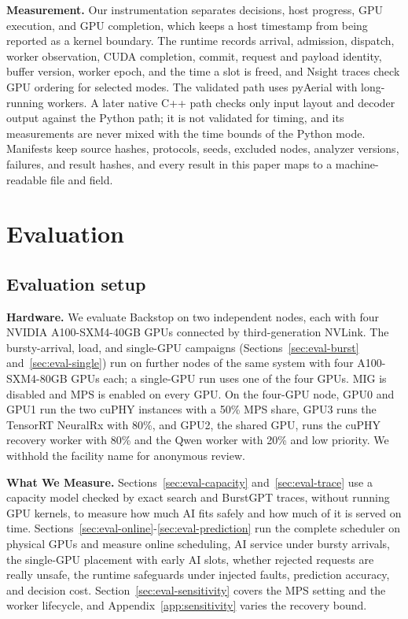 \documentclass[acmsmall,screen,review,anonymous]{acmart}
\newcommand{\sys}{Backstop\xspace}
\newcommand{\NRx}{NeuralRx\xspace}
\begin{document}
\noindent\textbf{Measurement.}
Our instrumentation separates decisions, host progress, GPU execution, and GPU completion, which keeps
a host timestamp from being reported as a kernel boundary. The runtime records arrival, admission,
dispatch, worker observation, CUDA completion, commit, request and payload identity, buffer version,
worker epoch, and the time a slot is freed, and Nsight traces check GPU ordering for selected modes. The
validated path uses pyAerial with long-running workers. A later native C++ path checks only input layout
and decoder output against the Python path; it is not validated for timing, and its measurements are
never mixed with the time bounds of the Python mode. Manifests keep source hashes, protocols, seeds,
excluded nodes, analyzer versions, failures, and result hashes, and every result in this paper maps to a
machine-readable file and field.

\section{Evaluation}
\label{sec:evaluation}

\subsection{Evaluation setup}
\label{sec:methodology}

\noindent\textbf{Hardware.}
We evaluate \sys on two independent nodes, each with four NVIDIA A100-SXM4-40GB GPUs connected by
third-generation NVLink. The bursty-arrival, load, and single-GPU campaigns
(Sections~\ref{sec:eval-burst} and~\ref{sec:eval-single}) run on further nodes of the same system with four
A100-SXM4-80GB GPUs each; a single-GPU run uses one of the four GPUs. MIG is disabled and MPS is enabled
on every GPU. On the four-GPU node, GPU0 and GPU1 run the two cuPHY instances with a 50\% MPS share, GPU3
runs the TensorRT \NRx with 80\%, and GPU2, the shared GPU, runs the cuPHY recovery worker with 80\% and
the Qwen worker with 20\% and low priority. We withhold the facility name for anonymous review.

\noindent\textbf{What We Measure.}
Sections~\ref{sec:eval-capacity} and~\ref{sec:eval-trace} use a capacity model checked by exact search and
BurstGPT traces, without running GPU kernels, to measure how much AI fits safely and how much of it is
served on time. Sections~\ref{sec:eval-online}-\ref{sec:eval-prediction} run the complete scheduler on
physical GPUs and measure online scheduling, AI service under bursty arrivals, the single-GPU placement
with early AI slots, whether rejected requests are really unsafe, the runtime safeguards under injected
faults, prediction accuracy, and decision cost. Section~\ref{sec:eval-sensitivity} covers the MPS setting
and the worker lifecycle, and Appendix~\ref{app:sensitivity} varies the recovery bound.
\end{document}
